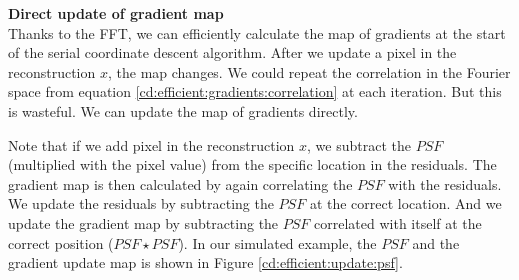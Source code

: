 \textbf{Direct update of gradient map}\\
Thanks to the FFT, we can efficiently calculate the map of gradients at the start of the serial coordinate descent algorithm. After we update a pixel in the reconstruction $x$, the map changes. We could repeat the correlation in the Fourier space from equation \eqref{cd:efficient:gradients:correlation} at each iteration. But this is wasteful. We can update the map of gradients directly.

Note that if we add pixel in the reconstruction $x$, we subtract the $PSF$ (multiplied with the pixel value) from the specific location in the residuals. The gradient map is then calculated by again correlating the $PSF$ with the residuals. We update the residuals by subtracting the $PSF$ at the correct location. And we update the gradient map by subtracting the $PSF$ correlated with itself at the correct position ($PSF \star PSF$). In our simulated example, the $PSF$ and the gradient update map is shown in Figure \ref{cd:efficient:update:psf}.
